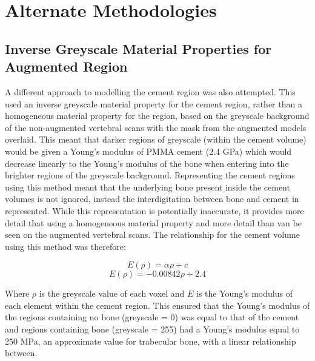 \chapter{Alternate Methodologies} 

\section{Inverse Greyscale Material Properties for Augmented Region} \label{sec:invGS}

A different approach to modelling the cement region was also attempted.  This
used an inverse greyscale material property for the cement region, rather than
a homogeneous material property for the region, based on the greyscale
background of the non-augmented vertebral scans with the mask from the
augmented models overlaid.  This meant that darker regions of greyscale (within
the cement volume) would be given a Young's modulus of PMMA cement (2.4 GPa)
which would decrease linearly to the Young's modulus of the bone when entering
into the brighter regions of the greyscale background.  Representing the cement
regions using this method meant that the underlying bone present inside the
cement volumes is not ignored, instead the interdigitation between bone and
cement in represented.  While this representation is potentially inaccurate, it
provides more detail that using a homogeneous material property and more detail
than van be seen on the augmented vertebral scans.  The relationship for the
cement volume using this method was therefore:

\begin{equation}
	E(\rho) = \alpha \rho + c
\end{equation}
\begin{equation}
	E(\rho) = -0.00842 \rho + 2.4
\end{equation}

Where $\rho$ is the greyscale value of each voxel and $E$ is the Young's
modulus of each element within the cement region.  This ensured that the
Young's modulus of the regions containing no bone (greyscale = 0)  was equal to
that of the cement and regions containing bone (greyscale = 255) had a Young's
modulus equal to 250 MPa, an approximate value for trabecular bone, with a
linear relationship between.


